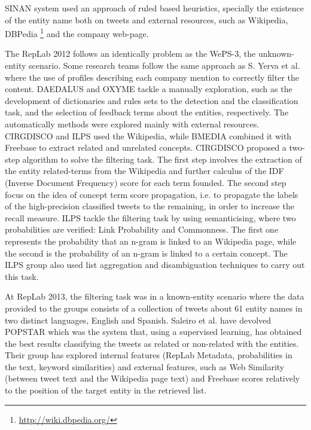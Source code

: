 SINAN \cite{kn:Cumbreras2010} system used an approach of ruled based heuristics, specially the existence of the entity name both on tweets and external resources, such as Wikipedia, DBPedia \footnote{\url{http://wiki.dbpedia.org/}} and the company web-page.

The RepLab 2012 follows an identically problem as the WePS-3, the unknown-entity scenario. Some research teams follow the same approach as S. Yerva et al. \cite{kn:Yerva2010} where the use of profiles describing each company mention to correctly filter the content. DAEDALUS \cite{kn:villena2012} and OXYME \cite{kn:kaptein2012} tackle a manually exploration, such as the development of dictionaries and rules sets to the detection and the classification task, and the selection of feedback terms about the entities, respectively. The automatically methods were explored mainly with external resources. CIRGDISCO \cite{kn:Qureshi2015} and ILPS \cite{kn:peetz2012} used the Wikipedia, while BMEDIA \cite{kn:Chenlo2012} combined it with Freebase to extract related and unrelated concepts. CIRGDISCO proposed a two-step algorithm to solve the filtering task. The first step involves the extraction of the entity related-terms from the Wikipedia and further calculus of the IDF (Inverse Document Frequency) score for each term founded. The second step focus on the idea of concept term score propagation, i.e. to propagate the labels of the high-precision classified tweets to the remaining, in order to increase the recall measure. ILPS tackle the filtering task by using semanticising, where two probabilities are verified: Link Probability and Commonness. The first one represents the probability that an n-gram is linked to an Wikipedia page, while the second is the probability of an n-gram is linked to a certain concept. The ILPS group also used list aggregation and disambiguation techniques to carry out this task.

At RepLab 2013, the filtering task was in a known-entity scenario where the data provided to the groups consists of a collection of tweets about 61 entity names in two distinct languages, English and Spanish. Saleiro et al. \cite{kn:Saleiro2013} have devolved POPSTAR which was the system that, using a supervised learning, has obtained the best results classifying the tweets as related or non-related with the entities. Their group has explored internal features (RepLab Metadata, probabilities in the text, keyword similarities) and external features, such as Web Similarity (between tweet text and the Wikipedia page text) and Freebase scores relatively to the position of the target entity in the retrieved list.

